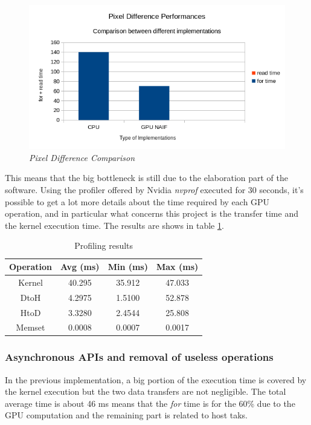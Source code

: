 \documentclass[paper=a4, fontsize=10pt]{scrartcl}	%
\begin{document}
	\begin{figure}[H]
		\centering
		\includegraphics[width=0.8\linewidth]{images/chart2.png}
		\caption{\textit{Pixel Difference Comparison}}
		\label{fig:chart2}
	\end{figure}

	This means that the big bottleneck is still due to the elaboration part of the software. Using the profiler offered by Nvidia \textit{nvprof} executed for 30 seconds, it's possible to get a lot more details about the time required by each GPU operation, and in particular what concerns this project is the transfer time and the kernel execution time. The results are shows in table \ref{tab:nvprof_naif}.

	\begin{table}[H]
		\centering
		\begin{tabular}{||c | c c c||} 
			\hline
			Operation & Avg (ms) & Min (ms) & Max (ms) \\ [0.5ex] 
			\hline\hline
			Kernel & 40.295 & 35.912 & 47.033 \\ 
			\hdashline
			DtoH & 4.2975 & 1.5100 & 52.878 \\
			\hdashline
			HtoD & 3.3280 & 2.4544 & 25.808 \\
			\hdashline
			Memset & 0.0008 & 0.0007 & 0.0017 \\
			\hline
		\end{tabular}
		\caption{Profiling results}
		\label{tab:nvprof_naif}
	\end{table}

	\subsubsection{Asynchronous APIs and removal of useless operations}
	\label{sec:removal-of-useless-operations}

	In the previous implementation, a big portion of the execution time is covered by the kernel execution but the two data transfers are not negligible. The total average time is about 46 ms means that the \textit{for} time is for the 60\% due to the GPU computation and the remaining part is related to host taks.\\
\end{document}
